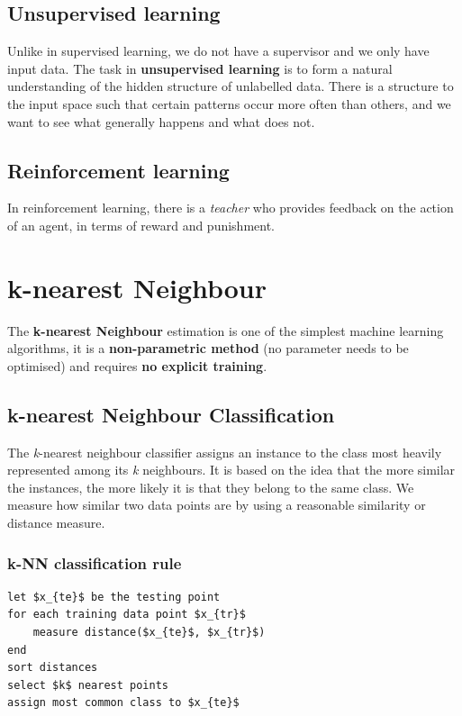 \documentclass[11pt,fleqn]{book} %
\begin{document}
\section{Unsupervised learning}
Unlike in supervised learning, we do not have a supervisor and we only have input data. The task in \textbf{unsupervised learning} is to form a natural understanding of the hidden structure of unlabelled data. There is a structure to the input space such that certain patterns occur more often than others, and we want to see what generally happens and what does not.

\section{Reinforcement learning}
In reinforcement learning, there is a \textit{teacher} who provides feedback on the action of an agent, in terms of reward and punishment.


\chapter{k-nearest Neighbour}
The \textbf{k-nearest Neighbour} estimation is one of the simplest machine learning algorithms, it is a \textbf{non-parametric method} (no parameter needs to be optimised) and requires \textbf{no explicit training}.

\section{k-nearest Neighbour Classification}
The \textit{k}-nearest neighbour classifier assigns an instance to the class most heavily represented among its \textit{k} neighbours. It is based on the idea that the more similar the instances, the more likely it is that they belong to the same class. We measure how similar two data points are by using a reasonable similarity or distance measure.

\subsection{k-NN classification rule}
\begin{lstlisting}[mathescape]
let $x_{te}$ be the testing point
for each training data point $x_{tr}$
    measure distance($x_{te}$, $x_{tr}$)
end
sort distances
select $k$ nearest points
assign most common class to $x_{te}$
\end{lstlisting}
\end{document}
